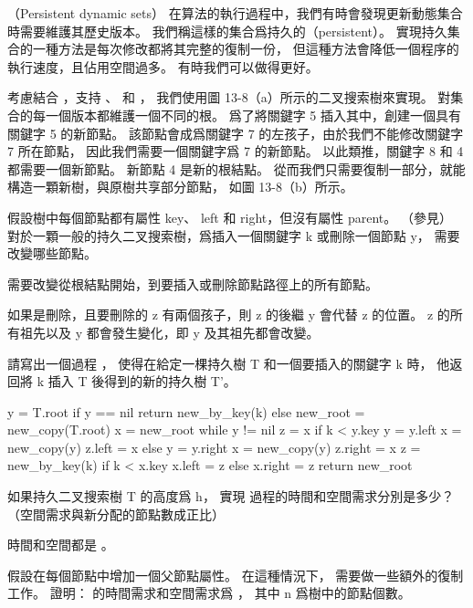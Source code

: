 \startsubject[
  title={Problems},
]

\startPROBLEM
（Persistent dynamic sets）
在算法的執行過程中，我們有時會發現更新動態集合時需要維護其歷史版本。
我們稱這樣的集合爲{\EMP 持久的（persistent）}。
實現持久集合的一種方法是每次修改都將其完整的復制一份，
但這種方法會降低一個程序的執行速度，且佔用空間過多。
有時我們可以做得更好。

考慮結合 ，支持 、  和 ，
我們使用圖 13-8（a）所示的二叉搜索樹來實現。
對集合的每一個版本都維護一個不同的根。
爲了將關鍵字 5 插入其中，創建一個具有關鍵字 5 的新節點。
該節點會成爲關鍵字 7 的左孩子，由於我們不能修改關鍵字 7 所在節點，
因此我們需要一個關鍵字爲 7 的新節點。
以此類推，關鍵字 8 和 4 都需要一個新節點。
新節點 4 是新的根結點。
從而我們只需要復制一部分，就能構造一顆新樹，與原樹共享部分節點，
如圖 13-8（b）所示。

假設樹中每個節點都有屬性 key、 left 和 right，但沒有屬性 parent。
（參見）
\startigBase[a]
\startitem%
對於一顆一般的持久二叉搜索樹，爲插入一個關鍵字 k 或刪除一個節點 y，
需要改變哪些節點。
\stopitem

\startANSWER
需要改變從根結點開始，到要插入或刪除節點路徑上的所有節點。

如果是刪除，且要刪除的 z 有兩個孩子，則 z 的後繼 y 會代替 z 的位置。
 z 的所有祖先以及 y 都會發生變化，即 y 及其祖先都會改變。
\stopANSWER

\startitem%
請寫出一個過程 ，
使得在給定一棵持久樹 T 和一個要插入的關鍵字 k 時，
他返回將 k 插入 T 後得到的新的持久樹 T'。
\stopitem

\startANSWER
{}
\startCLRS
y = T.root
if y == nil
	return new_by_key(k)
else
	new_root = new_copy(T.root)
	x = new_root
	while y != nil
		z = x
		if k < y.key
			y = y.left
			x = new_copy(y)
			z.left = x
		else
			y = y.right
			x = new_copy(y)
			z.right = x
			z = new_by_key(k)
			if k < x.key
				x.left = z
			else
				x.right = z
	return new_root
\stopCLRS
\stopANSWER

\startitem%
如果持久二叉搜索樹 T 的高度爲 h，
實現  過程的時間和空間需求分別是多少？
（空間需求與新分配的節點數成正比）
\stopitem

\startANSWER
時間和空間都是 。
\stopANSWER

\startitem%
假設在每個節點中增加一個父節點屬性。
在這種情況下，  需要做一些額外的復制工作。
證明：  的時間需求和空間需求爲 ，
其中 n 爲樹中的節點個數。
\stopitem

